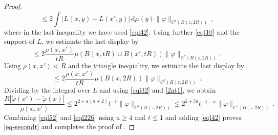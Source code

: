 \documentclass[10pt,a4paper]{article}
\theoremstyle{plain}
\theoremstyle{definition}
\numberwithin{equation}{subsection}
\begin{document}
\begin{proof}
\begin{equation}
    \le 2 \int |L(x,y) -L(x',y)| \, \mathrm{d}\mu(y)
    \|\varphi\|_{C^\tau(B(z, 2R))}\, ,
\end{equation}
where in the last inequality we have used \eqref{eql42}.
Using further \eqref{eql10} and the support of $L$, we estimate the last display by
\begin{equation}\label{eql224}\le 2 \frac{\rho(x,x')} {tR}\mu(B(x,tR)\cup B(x',tR))
\|\varphi\|_{C^\tau(B(z, 2R))}\, .
    \end{equation}
  Using $\rho(x,x')<R$ and the triangle inequality, we estimate the last display by
\begin{equation}\label{eql225}\le 2
\frac{\rho(x,x')} {tR}
\mu(B(x,2R))
\|\varphi\|_{C^\tau(B(z, 2R))}\, .
    \end{equation}
Dividing by the integral over $L$ and using \eqref{eql32} and \eqref{2nt1}, we obtain
\begin{equation}\label{eql226}
 \frac {R |\tilde{\varphi}(x') - \tilde \varphi(x)|}{\rho(x,x')}
 \le 2^{2+a(n+2)}t^{-1}\|\varphi\|_{C^\tau(B(z, 2R))} \le
 2^{2+3a} t^{-1-a} \|\varphi\|_{C^\tau(B(z, 2R))}\, .
\end{equation}
Combining \eqref{eql52} and \eqref{eql226} using $a\ge 4$ and $t\le 1$ and
adding \eqref{eql42} proves \eqref{eq-secondt} and completes the proof
of .
\end{proof}
\end{document}
